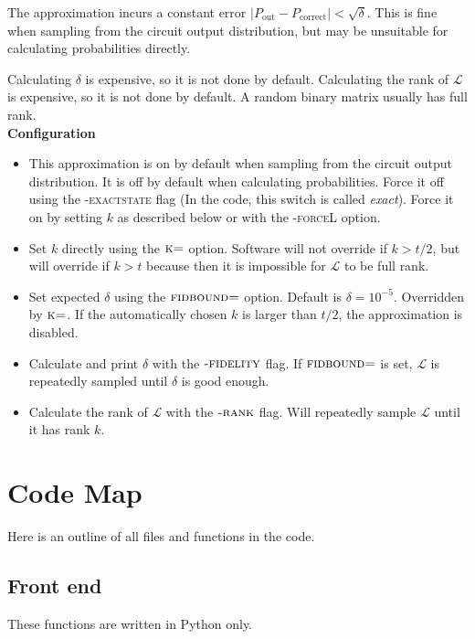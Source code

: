 \documentclass[11pt]{article}
\begin{document}
The approximation incurs a constant error $\left|P_\text{out} - P_\text{correct}\right| < \sqrt{\delta}$. This is fine when sampling from the circuit output distribution, but may be unsuitable for calculating probabilities directly.

Calculating $\delta$ is expensive, so it is not done by default. Calculating the rank of $\mathcal{L}$ is expensive, so it is not done by default. A random binary matrix usually has full rank.\\

\noindent \textbf{Configuration}
\begin{itemize}
    \item This approximation is on by default when sampling from the circuit output distribution. It is off by default when calculating probabilities. Force it off using the \textsc{-exactstate} flag (In the code, this switch is called \textit{exact}). Force it on by setting $k$ as described below or with the \textsc{-forceL} option.
    \item Set $k$ directly using the $\textsc{k=}$ option. Software will not override if $k > t/2$, but will override if $k>t$ because then it is impossible for $\mathcal{L}$ to be full rank.
    \item Set expected $\delta$ using the $\textsc{fidbound=}$ option. Default is $\delta = 10^{-5}$. Overridden by $\textsc{k=}$. If the automatically chosen $k$ is larger than $t/2$, the approximation is disabled.
    \item Calculate and print $\delta$ with the $\textsc{-fidelity}$ flag. If $\textsc{fidbound=}$ is set, $\mathcal{L}$ is repeatedly sampled until $\delta$ is good enough.
    \item Calculate the rank of $\mathcal{L}$ with the $\textsc{-rank}$ flag. Will repeatedly sample $\mathcal{L}$ until it has rank $k$.
\end{itemize}

\section{Code Map}

Here is an outline of all files and functions in the code.

\subsection{Front end}
These functions are written in Python only.
\end{document}
